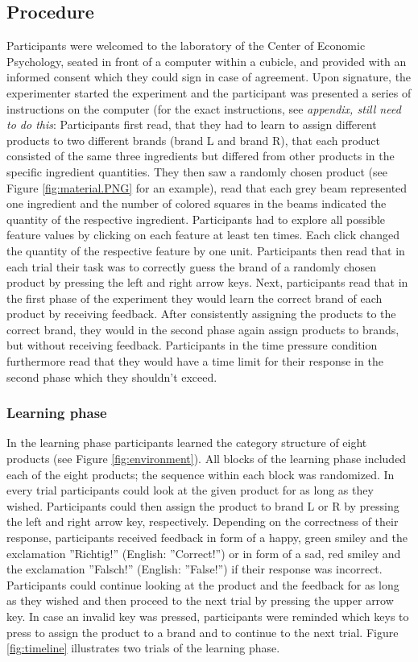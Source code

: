 \documentclass[a4paper,man,natbib]{apa6}
\begin{document}
\subsection{Procedure}
Participants were welcomed to the laboratory of the Center of Economic Psychology, seated in front of a computer within a cubicle, and provided with an informed consent which they could sign in case of agreement. Upon signature, the experimenter started the experiment and the participant was presented a series of instructions on the computer (for the exact instructions, see \textit{appendix, still need to do this}: Participants first read, that they had to learn to assign different products to two different brands (brand L and brand R), that each product consisted of the same three ingredients but differed from other products in the specific ingredient quantities. They then saw a randomly chosen product (see Figure \ref{fig:material.PNG} for an example), read that each grey beam represented one ingredient and the number of colored squares in the beams indicated the quantity of the respective ingredient. Participants had to explore all possible feature values by clicking on each feature at least ten times. Each click changed the quantity of the respective feature by one unit. Participants then read that in each trial their task was to correctly guess the brand of a randomly chosen product by pressing the left and right arrow keys. Next, participants read that in the first phase of the experiment they would learn the correct brand of each product by receiving feedback. After consistently assigning the products to the correct brand, they would in the second phase again assign products to brands, but without receiving feedback. Participants in the time pressure condition furthermore read that they would have a time limit for their response in the second phase which they shouldn't exceed.

\subsubsection{Learning phase}
In the learning phase participants learned the category structure of eight products (see Figure \ref{fig:environment}). All blocks of the learning phase included each of the eight products; the sequence within each block was randomized. In every trial participants could look at the given product for as long as they wished. Participants could then assign the product to brand L or R by pressing the left and right arrow key, respectively. Depending on the correctness of their response, participants received feedback in form of a happy, green smiley and the exclamation ''Richtig!'' (English: ''Correct!'') or in form of a sad, red smiley and the exclamation ''Falsch!'' (English: ''False!'') if their response was incorrect. Participants could continue looking at the product and the feedback for as long as they wished and then proceed to the next trial by pressing the upper arrow key. In case an invalid key was pressed, participants were reminded which keys to press to assign the product to a brand and to continue to the next trial. Figure \ref{fig:timeline} illustrates two trials of the learning phase.
\end{document}
